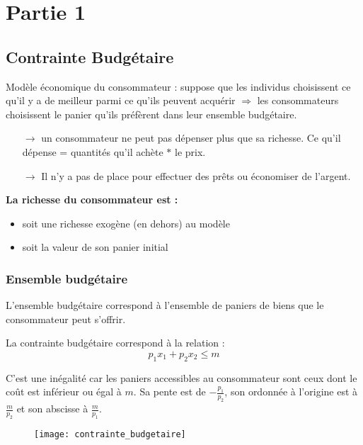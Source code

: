 \chapter{Partie 1} %

\section{Contrainte Budgétaire} %

Modèle économique du consommateur : suppose que les individus choisissent ce qu'il y a de meilleur parmi ce qu'ils peuvent acquérir $\Rightarrow$ les consommateurs choisissent le panier qu'ils préfèrent dans leur ensemble budgétaire.
\begin{itemize}
\item[$\rightarrow$] un consommateur ne peut pas dépenser plus que sa richesse. Ce qu'il dépense = quantités qu'il achète $*$ le prix.
\item[$\rightarrow$] Il n'y a pas de place pour effectuer des prêts ou économiser de l'argent.
\end{itemize}

\textbf{La richesse du consommateur est :}
\begin{itemize}
\item soit une richesse exogène (en dehors) au modèle
\item soit la valeur de son panier initial
\end{itemize}

\subsection{Ensemble budgétaire} %

L'ensemble budgétaire correspond à l'ensemble de paniers de biens que le consommateur peut s'offrir.

La contrainte budgétaire correspond à la relation :
\begin{equation*}
p_1 x_1 + p_2 x_2 \leq m
\end{equation*}

C'est une inégalité car les paniers accessibles au consommateur sont ceux dont le coût est inférieur ou égal à $m$. Sa pente est de $-\frac{p_1}{p_2}$, son ordonnée à l'origine est à $\frac{m}{p_2}$ et son abscisse à $\frac{m}{p_1}$.

\begin{figure}[H]
    \centering
    \texttt{[image: contrainte\_budgetaire]}
\end{figure}

